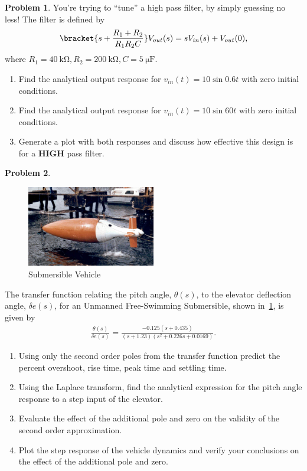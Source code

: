 \documentclass[10pt]{article}
\theoremstyle{definition}
\newtheorem{prob}{Problem}[section]
\newenvironment{subprob}%
{\renewcommand{\theenumi}{\alph{enumi}}\renewcommand{\labelenumi}{(\theenumi)}\begin{enumerate}}%
{\end{enumerate}}%
\begin{document}
\clearpage\newpage
\begin{prob}
    You're trying to ``tune'' a high pass filter,  by simply guessing no less!
    The filter is defined by
    \begin{align}
    \bracket{s + \frac{R_1 + R_2}{R_1 R_2 C} } V_{out}(s) = s V_{in}(s) + V_{out}(0) ,
    \end{align}
    where \( R_1 = \SI{40}{\kilo\ohm}, R_2 = \SI{200}{\kilo\ohm}, C = \SI{5}{\micro\farad}\).
    \begin{subprob}
    \item Find the analytical output response for \( v_{in}(t) = 10 \sin 0.6 t \) with zero initial conditions.
    \item Find the analytical output response for \( v_{in}(t) = 10 \sin 60 t \) with zero initial conditions.
    \item  Generate a plot with both responses and discuss how effective this design is for a \textbf{HIGH} pass filter.
    \end{subprob}
\end{prob}


\begin{prob}
    \begin{figure}[h]
        \centering
        \includegraphics[width=0.5\textwidth]{figures/UFSS-TEST-PHOTO-1.jpg}
        \caption{Submersible Vehicle~\label{fig:vehicle}}
    \end{figure}
    The transfer function relating the pitch angle, \( \theta (s) \), to the elevator deflection angle, \( \delta e (s) \), for an Unmanned Free-Swimming Submersible, shown in~\cref{fig:vehicle}, is given by
    \begin{align}
        \frac{\theta (s) }{\delta e(s)} = \frac{-0.125 (s + 0.435)}{(s+1.23)(s^2 + 0.226 s + 0.0169)} .
    \end{align}

    \begin{subprob}
    \item Using only the second order poles from the transfer function predict the percent overshoot, rise time, peak time and settling time.
    \item Using the Laplace transform, find the analytical expression for the pitch angle response to a step input of the elevator.
    \item Evaluate the effect of the additional pole and zero on the validity of the second order approximation.
    \item Plot the step response of the vehicle dynamics and verify your conclusions on the effect of the additional pole and zero.
    \end{subprob}
\end{prob}
\end{document}
